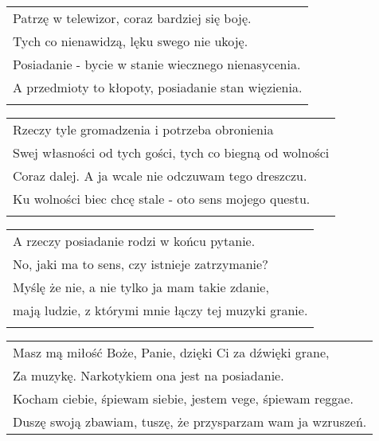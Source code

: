 \documentclass[a5paper]{article}
\begin{document}
\noindent
\begin{tabular}{@{}p{12cm}@{}}
Patrzę w telewizor, coraz bardziej się boję. \\
Tych co nienawidzą, lęku swego nie ukoję. \\
Posiadanie - bycie w stanie wiecznego nienasycenia. \\
A przedmioty to kłopoty, posiadanie stan więzienia. \\ \\
\end{tabular}

\noindent
\begin{tabular}{@{}p{12cm}@{}}
Rzeczy tyle gromadzenia i potrzeba obronienia \\
Swej własności od tych gości, tych co biegną od wolności \\
Coraz dalej. A ja wcale nie odczuwam tego dreszczu. \\
Ku wolności biec chcę stale - oto sens mojego questu. \\ \\
\end{tabular}

\noindent
\begin{tabular}{@{}p{12cm}@{}}
A rzeczy posiadanie rodzi w końcu pytanie. \\
No, jaki ma to sens, czy istnieje zatrzymanie? \\
Myślę że nie, a nie tylko ja mam takie zdanie, \\
mają ludzie, z którymi mnie łączy tej muzyki granie. \\ \\
\end{tabular}

\noindent
\begin{tabular}{@{}p{12cm}@{}}
Masz mą miłość Boże, Panie, dzięki Ci za dźwięki grane, \\
Za muzykę. Narkotykiem ona jest na posiadanie. \\
Kocham ciebie, śpiewam siebie, jestem vege, śpiewam reggae. \\
Duszę swoją zbawiam, tuszę, że przysparzam wam ja wzruszeń.
\end{tabular}
\end{document}
